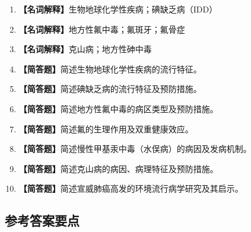 \documentclass[10pt,a4paper,oneside]{ctexbook}
\begin{document}
\begin{enumerate}[leftmargin=*, itemsep=8pt]
    \item \textbf{【名词解释】}生物地球化学性疾病；碘缺乏病（IDD）
    \item \textbf{【名词解释】}地方性氟中毒；氟斑牙；氟骨症
    \item \textbf{【名词解释】}克山病；地方性砷中毒
    \item \textbf{【简答题】}简述生物地球化学性疾病的流行特征。
    \item \textbf{【简答题】}简述碘缺乏病的流行特征及预防措施。
    \item \textbf{【简答题】}简述地方性氟中毒的病区类型及预防措施。
    \item \textbf{【简答题】}简述氟的生理作用及双重健康效应。
    \item \textbf{【简答题】}简述慢性甲基汞中毒（水俣病）的病因及发病机制。
    \item \textbf{【简答题】}简述克山病的病因、病理特征及预防措施。
    \item \textbf{【简答题】}简述宣威肺癌高发的环境流行病学研究及其启示。
\end{enumerate}

\subsection*{参考答案要点}
\end{document}
